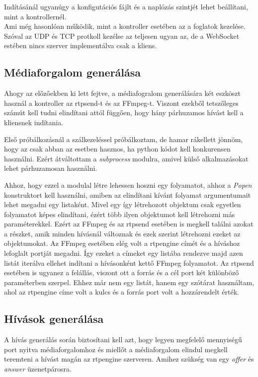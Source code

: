 Indításánál ugyanúgy a konfigutációs fájlt és a naplózás szintjét lehet beállítani,
mint a kontrollernél. \\

Ami még hasonlóan működik, mint a kontroller esetében az a foglatok kezelése.
Szóval az UDP és TCP protkoll kezélse az teljesen ugyan az, de a WebSocket estében
nincs szerver implementálva csak a kliens. 

\subsection{Médiaforgalom generálása}

Ahogy az előzőekben ki lett fejtve, a médiafogralom generálására két eszköszt 
használ a kontroller az rtpsend-t és az FFmpeg-t. Viszont ezekből tetszőleges
számút kell tudni elindítani attól függően, hogy hány párhuzamos hívást kell 
a kliensnek indítania.

Első próbálkozásnál a szálkezeléssel próbálkoztam, de hamar rákellett jönnöm,
hogy az csak abban az esetben hasznos, ha python kódot kell konkurensen 
használni. Ezért átváltottam a \textit{subprocess} modulra, amivel külső alkalmazásokat
lehet párhuzamosan használni.

Ahhoz, hogy ezzel a modulal létre lehessen hoszni egy folyamatot, ahhoz a \textit{Popen}
konstruktort kell használni, amiben az elindítani kívánt folyamat argumentumait lehet
megadni egy listaként. Mivel egy így létrehozott objektum csak egyetlen folyamatot 
képes elindítani, ézért több ilyen objektumot kell létrehozni más paraméterekkel. Ezért
az FFmpeg és az rtpsend esetében is megkell találni azokat a részket, amik minden 
hívásnál változnak és ezek szerint létrehozni ezeket az objektumokat. Az FFmpeg esetében
elég volt a rtpengine címét és a híváshoz lefoglalt portját megadni. Így ezeket a címeket
egy listába rendezve majd azen listát iterálva ellehet indítani a hívásonként kettő
FFmpeg folyamatot. Az rtpsend esetében is ugyanez a felállás, viszont ott a forrás és 
a cél port két különböző paraméterben szerpel. Ehhez már nem egy listát, hanem egy 
szótárat használtam, ahol az rtpengine címe volt a kulcs és a forrás port volt a hozzárendelt
érték.

\subsection{Hívások generálása}

A hívás generálás során biztosítani kell azt, hogy legyen megfelelő mennyiségű port
nyitva médiaforgalomhoz és miellőt a médiaforgalom elindul megkell teremteni a hívást
magán az rtpengine szerveren. Amihez szükség van egy \textit{offer} és \textit{answer}
üzenetpárosra.

